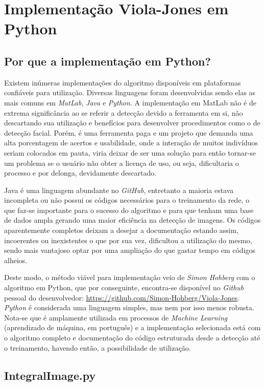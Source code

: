 \documentclass[12pt,a4paper]{article}
\begin{document}
\section{Implementação Viola-Jones em Python}

\subsection{Por que a implementação em Python?}
	Existem inúmeras implementações do algoritmo disponíveis em plataformas confiáveis para utilização. Diversas linguagens foram desenvolvidas sendo elas as mais comuns em \textit{MatLab}, \textit{Java} e \textit{Python}. A implementação em MatLab não é de extrema significância ao se referir a detecção devido a ferramenta em si, não descartando sua utilização e benefícios para desenvolver procedimentos como o de detecção facial. Porém, é uma ferramenta paga e um projeto que demanda uma alta porcentagem de acertos e usabilidade, onde a interação de muitos indivíduos seriam colocados em pauta, viria deixar de ser uma solução para então tornar-se um problema se o usuário não obter a licença de uso, ou seja, dificultaria o processo e por delonga, devidamente descartado.  

	Java é uma linguagem abundante no \textit{GitHub}, entretanto a maioria estava incompleta ou não possui os códigos necessários para o treinamento da rede, o que faz-se importante para o sucesso do algoritmo e para que tenham uma base de dados ampla gerando uma maior eficiência na detecção de imagens. Os códigos aparentemente completos deixam a desejar a documentação estando assim, incoerentes ou inexistentes o que por sua vez, dificultou a utilização do mesmo, sendo mais vantajoso optar por uma ampliação do que gastar tempo em códigos alheios. 

	Deste modo, o método viável para implementação veio de \textit{Simon Hohberg} com o algoritmo em Python, que por conseguinte, encontra-se disponível no \textit{Github} pessoal do desenvolvedor:
\url{https://github.com/Simon-Hohberg/Viola-Jones}. \textit{Python} é considerada uma linguagem simples, mas nem por isso menos robusta. Nota-se que é amplamente utilizada em processos de \textit{Machine Learning} (aprendizado de máquina, em português) e a implementação selecionada está com o algoritmo completo e documentação do código estruturada desde a detecção até o treinamento, havendo então, a possibilidade de utilização. 



\subsection{IntegralImage.py}
\end{document}
